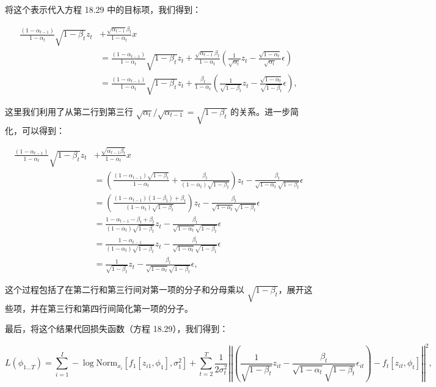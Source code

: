 将这个表示代入方程 18.29 中的目标项，我们得到：

\begin{align}
\frac{(1 - \alpha_{t-1})}{1 - \alpha_t} \sqrt{1 - \beta_t}z_t &+ \frac{\sqrt{\alpha_{t-1}}\beta_t}{1 - \alpha_t}x  \\
&= \frac{(1 - \alpha_{t-1})}{1 - \alpha_t} \sqrt{1 - \beta_t} z_t + \frac{\sqrt{\alpha_{t-1}}\beta_t}{1 - \alpha_t} \left( \frac{1}{\sqrt{\alpha_t}} z_t - \frac{\sqrt{1 - \alpha_t}}{\sqrt{\alpha_t}} \epsilon \right) \\
&= \frac{(1 - \alpha_{t-1})}{1 - \alpha_t} \sqrt{1 - \beta_t} z_t + \frac{\beta_t}{1 - \alpha_t} \left( \frac{1}{\sqrt{1 - \beta_t}} z_t - \frac{\sqrt{1 - \alpha_t}}{\sqrt{1 - \beta_t}} \epsilon \right),
\end{align} 


这里我们利用了从第二行到第三行 \(\sqrt{\alpha_t} / \sqrt{\alpha_{t-1}} = \sqrt{1 - \beta_t}\) 的关系。进一步简化，可以得到：

\begin{align}
\frac{(1 - \alpha_{t-1})}{1 - \alpha_t} \sqrt{1 - \beta_t} z_t &+ \frac{\sqrt{\alpha_{t-1}\beta_t}}{1 - \alpha_t} x  \\
&= \left( \frac{(1 - \alpha_{t-1})\sqrt{1 - \beta_t}}{1 - \alpha_t} + \frac{\beta_t}{(1 - \alpha_t)\sqrt{1 - \beta_t}} \right) z_t - \frac{\beta_t}{\sqrt{1 - \alpha_t}\sqrt{1 - \beta_t}} \epsilon \\
&= \left( \frac{(1 - \alpha_{t-1})(1 - \beta_t) + \beta_t}{(1 - \alpha_t)\sqrt{1 - \beta_t}} \right) z_t - \frac{\beta_t}{\sqrt{1 - \alpha_t}\sqrt{1 - \beta_t}} \epsilon \\
&= \frac{1 - \alpha_{t-1} - \beta_t + \beta_t}{(1 - \alpha_t)\sqrt{1 - \beta_t}} z_t - \frac{\beta_t}{\sqrt{1 - \alpha_t}\sqrt{1 - \beta_t}} \epsilon \\
&= \frac{1 - \alpha_{t-1}}{(1 - \alpha_t)\sqrt{1 - \beta_t}} z_t - \frac{\beta_t}{\sqrt{1 - \alpha_t}\sqrt{1 - \beta_t}} \epsilon \\
&= \frac{1}{\sqrt{1 - \beta_t}} z_t - \frac{\beta_t}{\sqrt{1 - \alpha_t}\sqrt{1 - \beta_t}} \epsilon,
\end{align} 



这个过程包括了在第二行和第三行间对第一项的分子和分母乘以 \(\sqrt{1 - \beta_t}\)，展开这些项，并在第三行和第四行间简化第一项的分子。

最后，将这个结果代回损失函数（方程 18.29），我们得到：

\[
L(\phi_{1...T}) = \sum_{i=1}^I -\log \text{Norm}_{x_i} [f_1[z_{i1}, \phi_1], \sigma^2_{1}] + \sum_{t=2}^T \frac{1}{2\sigma^2_t} \left| \left| \left( \frac{1}{\sqrt{1 - \beta_t}}z_{it} - \frac{\beta_t}{\sqrt{1 - \alpha_t}\sqrt{1 - \beta_t}}\epsilon_{it} \right) - f_t[z_{it}, \phi_t] \right| \right|^2, \tag{18.34}
\]

